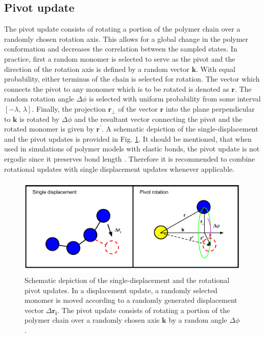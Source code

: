\documentclass[12pt]{report}
\begin{document}
\subsection{Pivot update}
The pivot update consists of rotating a portion of the polymer chain over a randomly chosen rotation axis. This allows for a global change in the polymer conformation and decreases the correlation between the sampled states. In practice, first a random monomer is selected to serve as the pivot and the direction of the rotation axis is defined by a random vector $\mathbf{k}$. With equal probability, either terminus of the chain is selected for rotation. The vector which connects the pivot to any monomer which is to be rotated is denoted as $\mathbf{r}$. The random rotation angle $\Delta \phi$ is selected with uniform probability from some interval $[-\lambda,\,\lambda]$. Finally, the projection $\mathbf{r}_{\bot}$ of the vector $\mathbf{r}$ into the plane perpendicular to $\mathbf{k}$ is rotated by $\Delta \phi$ and the resultant vector connecting the pivot and the rotated monomer is given by $\mathbf{r}^{\prime}$. A schematic depiction of the single-displacement and the pivot updates is provided in Fig. \ref{fig:conformUpdate}. It should be mentioned, that when used in simulations of polymer models with elastic bonds, the pivot update is not ergodic since it preserves bond length \cite{Bachmann2014}. Therefore it is recommended to combine rotational updates with single displacement updates whenever applicable. 

%
\begin{figure}
\center
\includegraphics[width = 0.99\textwidth]{chapter3Figs/conformationalUpdatesNew.pdf}
\caption{\label{fig:conformUpdate}%
Schematic depiction of the single-displacement and the rotational pivot updates.
In a displacement update, a randomly selected monomer is moved according to a randomly generated displacement vector $\Delta \mathbf{r_{i}}$. The pivot update consists of rotating a portion of the polymer chain over a randomly chosen axis $\mathbf{k}$ by a random angle $\Delta \phi$. 
}
\end{figure}
% 
\end{document}
